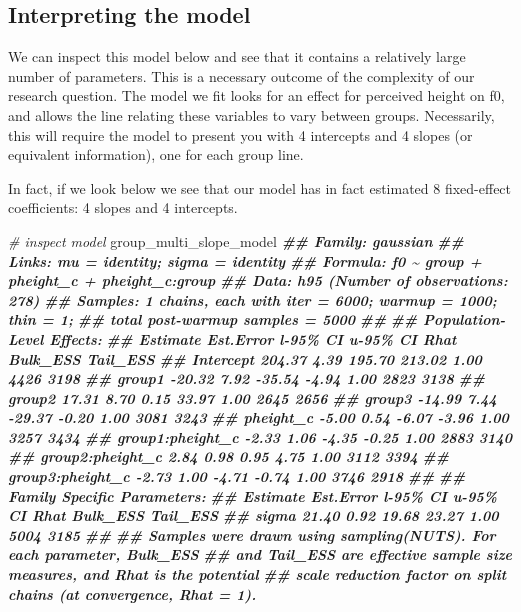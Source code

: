 \documentclass[
]{book}
\newenvironment{Shaded}{\begin{snugshade}}{\end{snugshade}}
\newcommand{\CommentTok}[1]{\textcolor[rgb]{0.56,0.35,0.01}{\textit{#1}}}
\newcommand{\DocumentationTok}[1]{\textcolor[rgb]{0.56,0.35,0.01}{\textbf{\textit{#1}}}}
\newcommand{\NormalTok}[1]{#1}
\begin{document}
\hypertarget{interpreting-the-model-3}{%
\subsection{Interpreting the model}\label{interpreting-the-model-3}}

We can inspect this model below and see that it contains a relatively large number of parameters. This is a necessary outcome of the complexity of our research question. The model we fit looks for an effect for perceived height on f0, and allows the line relating these variables to vary between groups. Necessarily, this will require the model to present you with 4 intercepts and 4 slopes (or equivalent information), one for each group line.

In fact, if we look below we see that our model has in fact estimated 8 fixed-effect coefficients: 4 slopes and 4 intercepts.

\begin{Shaded}
\begin{Highlighting}[]
\CommentTok{\# inspect model}
\NormalTok{group\_multi\_slope\_model}
\DocumentationTok{\#\#  Family: gaussian }
\DocumentationTok{\#\#   Links: mu = identity; sigma = identity }
\DocumentationTok{\#\# Formula: f0 \textasciitilde{} group + pheight\_c + pheight\_c:group }
\DocumentationTok{\#\#    Data: h95 (Number of observations: 278) }
\DocumentationTok{\#\# Samples: 1 chains, each with iter = 6000; warmup = 1000; thin = 1;}
\DocumentationTok{\#\#          total post{-}warmup samples = 5000}
\DocumentationTok{\#\# }
\DocumentationTok{\#\# Population{-}Level Effects: }
\DocumentationTok{\#\#                  Estimate Est.Error l{-}95\% CI u{-}95\% CI Rhat Bulk\_ESS Tail\_ESS}
\DocumentationTok{\#\# Intercept          204.37      4.39   195.70   213.02 1.00     4426     3198}
\DocumentationTok{\#\# group1             {-}20.32      7.92   {-}35.54    {-}4.94 1.00     2823     3138}
\DocumentationTok{\#\# group2              17.31      8.70     0.15    33.97 1.00     2645     2656}
\DocumentationTok{\#\# group3             {-}14.99      7.44   {-}29.37    {-}0.20 1.00     3081     3243}
\DocumentationTok{\#\# pheight\_c           {-}5.00      0.54    {-}6.07    {-}3.96 1.00     3257     3434}
\DocumentationTok{\#\# group1:pheight\_c    {-}2.33      1.06    {-}4.35    {-}0.25 1.00     2883     3140}
\DocumentationTok{\#\# group2:pheight\_c     2.84      0.98     0.95     4.75 1.00     3112     3394}
\DocumentationTok{\#\# group3:pheight\_c    {-}2.73      1.00    {-}4.71    {-}0.74 1.00     3746     2918}
\DocumentationTok{\#\# }
\DocumentationTok{\#\# Family Specific Parameters: }
\DocumentationTok{\#\#       Estimate Est.Error l{-}95\% CI u{-}95\% CI Rhat Bulk\_ESS Tail\_ESS}
\DocumentationTok{\#\# sigma    21.40      0.92    19.68    23.27 1.00     5004     3185}
\DocumentationTok{\#\# }
\DocumentationTok{\#\# Samples were drawn using sampling(NUTS). For each parameter, Bulk\_ESS}
\DocumentationTok{\#\# and Tail\_ESS are effective sample size measures, and Rhat is the potential}
\DocumentationTok{\#\# scale reduction factor on split chains (at convergence, Rhat = 1).}
\end{Highlighting}
\end{Shaded}
\end{document}
